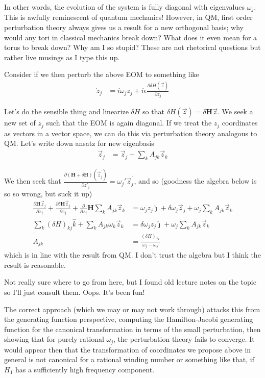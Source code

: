 \documentclass[10pt]{article}
\newcommand{\pd}[2]{\frac{\partial#1}{\partial#2}}
\newcommand{\pvec}[1]{\vec{#1}^{\,\prime}}
\begin{document}
In other words, the evolution of the system is fully diagonal with eigenvalues
$\omega_j$. This is awfully reminescent of quantum mechanics! However, in QM,
first order perturbation theory always gives us a result for a new orthogonal
basis; why would any tori in classical mechanics break down? What does it even
mean for a torus to break down? Why am I so stupid? These are not rhetorical
questions but rather live musings as I type this up.

Consider if we then perturb the above EOM to something like
\begin{align}
    \dot{z}_j &= i\omega_jz_j + i\epsilon \pd{\delta
    H\left(\vec{z}\right)}{z_j}
\end{align}

Let's do the sensible thing and linearize $\delta H$ so that
$\delta H(\vec{z}) = \delta \mathbf{H}\vec{z}$. We seek a new set of $z_j$
such that the EOM is again diagonal. If we treat the $z_j$ coordinates as
vectors in a vector space, we can do this via perturbation theory
analogous to QM\@. Let's write down ansatz for new eigenbasis
\begin{align}
    \vec{z}_j &= \vec{z}_j + \sum_kA_{jk}\vec{z}_k
\end{align}

We then seek that $\pd{(\mathbf{H} + \delta \mathbf{H})(\pvec{z}_j)}{z'_j} =
\omega_j' \pvec{z}_j$, and so (goodness the algebra below is so so wrong, but
suck it up)
\begin{align}
    \pd{\mathbf{H}\vec{z}_j}{z_j} + \pd{\delta \mathbf{H}\vec{z}_j}{z_j} +
        \pd{}{z_j}\mathbf{H}\sum_k A_{jk}\vec{z}_k
        &= \omega_j z_j\hat{\jmath} + \delta
        \omega_j \vec{z}_j + \omega_j \sum_k A_{jk}\vec{z}_k\\
    \sum_k (\delta H)_{kj}\hat{k} + \sum_kA_{jk}\omega_k \vec{z}_k &=
        \delta \omega_j z_j\hat{\jmath} + \omega_j \sum_k A_{jk}\vec{z}_k\\
    A_{jk} &= \frac{(\delta H)_{jk}}{\omega_j - \omega_k}
\end{align}
which is in line with the result from QM\@. I don't trust the algebra but I
think the result is reasonable.

Not really sure where to go from here, but I found old lecture notes on the
topic so I'll just consult them. Oops. It's been fun!

The correct approach (which we may or may not work through) attacks this from
the generating function perspective, computing the Hamilton-Jacobi generating
function for the canonical transformation in terms of the small perturbation,
then showing that for purely rational $\omega_j$, the perturbation theory fails
to converge. It would appear then that the transformation of coordinates we
propose above in general is not canonical for a rational winding number or
something like that, if $H_1$ has a sufficiently high frequency component.
\end{document}
